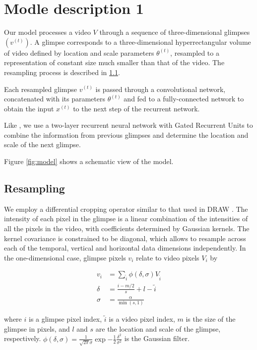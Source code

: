 \documentclass{article} %
\begin{document}
\section{Modle description 1}

Our model processes a video $V$ through a sequence of three-dimensional glimpses $\left(v^{(t)}\right)$.
A glimpse corresponds to a three-dimensional hyperrectangular volume of video defined by location and scale parameters $\theta^{(t)}$, resampled to a representation of constant size much smaller than that of the video.
The resampling process is described in \ref{sec:resampling}.

Each resampled glimpse $v^{(t)}$ is passed through a convolutional network, concatenated with its parameters $\theta^{(t)}$ and fed to a fully-connected network to obtain the input $x^{(t)}$ to the next step of the recurrent network.

Like \cite{Ba2014}, we use a two-layer recurrent neural network with Gated Recurrent Units\cite{Cho2014} to combine the information from previous glimpses and determine the location and scale of the next glimpse.

Figure \ref{fig:model} shows a schematic view of the model.

\subsection{Resampling}
\label{sec:resampling}

We employ a differential cropping operator similar to that used in DRAW \cite{draw}.
The intensity of each pixel in the glimpse is a linear combination of the intensities of all the pixels in the video, with coefficients determined by Gaussian kernels.
The kernel covariance is constrained to be diagonal, which allows to resample across each of the temporal, vertical and horizontal data dimensions independently.
In the one-dimensional case, glimpse pixels $v_i$ relate to video pixels $V_i$ by

\begin{equation}
\begin{split}
v_i &= \sum_{\tilde{i}} \phi(\delta,\sigma) V_{\tilde{i}} \\
\delta & =  \frac{i - m/2}{s} + l - \tilde{i} \\
\sigma & =  \frac{\alpha}{\min(s, 1)}
\end{split}
\end{equation}

where $i$ is a glimpse pixel index, $\tilde{i}$ is a video pixel index, $m$ is the size of the glimpse in pixels, and $l$ and $s$ are the location and scale of the glimpse, respectively.
$\phi( \delta, \sigma ) = \frac{1}{\sqrt{2 \pi}\sigma} \exp{- \frac{1}{2} \frac{\delta^2}{\sigma^2}}$ is the Gaussian filter.
\end{document}

